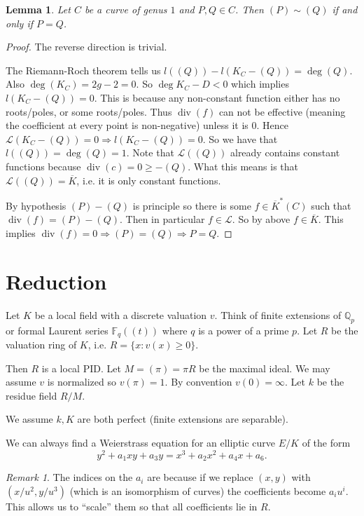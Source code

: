 \documentclass[11pt]{article}
\newcommand{\BB}[1]{\mathbb{#1}} %
\newcommand{\curly}[1]{\mathscr{#1}} %
\newcommand{\QQ}{\BB{Q}}
\newcommand{\FF}{\BB{F}}
\newcommand{\st}{\colon}
\renewcommand{\div}{\operatorname{div}} %
\theoremstyle{plain}%
\newtheorem{lem}[thm]{Lemma}
\theoremstyle{definition}
\theoremstyle{remark}
\newtheorem{rem}[thm]{Remark}
\begin{document}
\begin{lem} %
	Let $C$ be a curve of genus $1$ and $P,Q\in C$. Then $(P)\sim (Q)$ if and only if $P=Q$.
\end{lem}
\begin{proof} %
	The reverse direction is trivial.
	
	The Riemann-Roch theorem tells us $l((Q)) - l(K_C-(Q)) = \deg (Q)$. Also $\deg(K_C) = 2g-2 = 0$. So $\deg K_C-D<0$ which implies $l(K_C-(Q))=0$. This is because any non-constant function either has no roots/poles, or some roots/poles. Thus $\div(f)$ can not be effective (meaning the coefficient at every point is non-negative) unless it is $0$. Hence $\curly{L}(K_C-(Q))=0 \Rightarrow l(K_C-(Q))=0$. So we have that $l((Q))=\deg (Q) = 1$. Note that $\curly{L}((Q))$ already contains constant functions because $\div(c) = 0\geq -(Q)$. What this means is that $\curly{L}((Q))=\overline{K}$, i.e. it is only constant functions.
	
	By hypothesis $(P)-(Q)$ is principle so there is some $f\in\overline{K}^*(C)$ such that $\div(f) = (P) - (Q)$. Then in particular $f\in\curly{L}$. So by above $f\in\overline{K}$. This implies $\div(f) = 0 \Rightarrow (P)=(Q) \Rightarrow P=Q$.
\end{proof}


\section{Reduction}

Let $K$ be a local field with a discrete valuation $v$. Think of finite extensions of $\QQ_p$ or formal Laurent series $\FF_{q}((t))$ where $q$ is a power of a prime $p$. Let $R$ be the valuation ring of $K$, i.e. $R = \{x \st v(x)\geq 0\}$.

Then $R$ is a local PID. Let $M=(\pi)=\pi R$ be the maximal ideal. We may assume $v$ is normalized so $v(\pi)=1$. By convention $v(0)=\infty$. Let $k$ be the residue field $R/M$.

We assume $k,K$ are both perfect (finite extensions are separable).

We can always find a Weierstrass equation for an elliptic curve $E/K$ of the form
$$
y^2 + a_1xy + a_3y
=
x^3 + a_2x^2 + a_4x + a_6.
$$

\begin{rem}
	The indices on the $a_i$ are because if we replace $(x,y)$ with $(x/u^2,y/u^3)$ (which is an isomorphism of curves) the coefficients become $a_iu^i$. This allows us to ``scale'' them so that all coefficients lie in $R$.
\end{rem}
\end{document}
